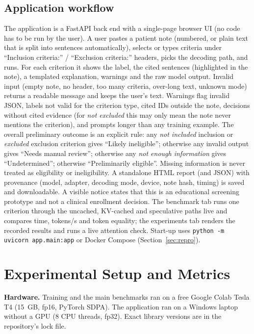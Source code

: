 \documentclass[conference]{IEEEtran}
\begin{document}
\subsection{Application workflow}\label{sec:app}
The application is a FastAPI back end with a single-page browser UI (no code has to be run by the user). A user pastes a patient note (numbered, or plain text that is split into sentences automatically), selects or types criteria under ``Inclusion criteria:'' / ``Exclusion criteria:'' headers, picks the decoding path, and runs. For each criterion it shows the label, the cited sentences (highlighted in the note), a templated explanation, warnings and the raw model output. Invalid input (empty note, no header, too many criteria, over-long text, unknown mode) returns a readable message and keeps the user's text. Warnings flag invalid JSON, labels not valid for the criterion type, cited IDs outside the note, decisions without cited evidence (for \emph{not excluded} this may only mean the note never mentions the criterion), and prompts longer than any training example. The overall preliminary outcome is an explicit rule: any \emph{not included} inclusion or \emph{excluded} exclusion criterion gives ``Likely ineligible''; otherwise any invalid output gives ``Needs manual review''; otherwise any \emph{not enough information} gives ``Undetermined''; otherwise ``Preliminarily eligible''. Missing information is never treated as eligibility or ineligibility. A standalone HTML report (and JSON) with provenance (model, adapter, decoding mode, device, note hash, timing) is saved and downloadable. A visible notice states that this is an educational screening prototype and not a clinical enrollment decision. The benchmark tab runs one criterion through the uncached, KV-cached and speculative paths live and compares time, tokens/s and token equality; the experiments tab renders the recorded results and runs a live attention check. Start-up uses \texttt{python -m uvicorn app.main:app} or Docker Compose (Section~\ref{sec:repro}).

\section{Experimental Setup and Metrics}\label{sec:metrics}
\textbf{Hardware.} Training and the main benchmarks ran on a free Google Colab Tesla T4 (15~GB, fp16, PyTorch SDPA). The application ran on a Windows laptop without a GPU (8 CPU threads, fp32). Exact library versions are in the repository's lock file.
\end{document}
